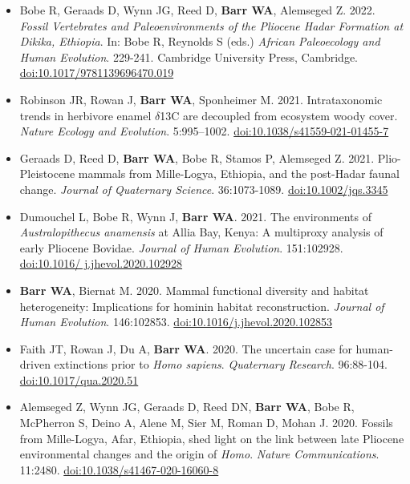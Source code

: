 \documentclass{article}
\begin{document}
\begin{itemize}
\item [] Bobe R, Geraads D, Wynn JG, Reed D, {\bfseries Barr WA}, Alemseged Z. 2022. \emph{Fossil Vertebrates and Paleoenvironments of the Pliocene Hadar Formation at Dikika, Ethiopia}. In: Bobe R, Reynolds S (eds.) \emph{African Paleoecology and Human Evolution}. 229-241. Cambridge University Press, Cambridge. \href{https://doi.org/10.1017/9781139696470.019}{doi:10.1017/9781139696470.019}

\item[] Robinson JR, Rowan J,  {\bfseries Barr WA}, Sponheimer M. 2021. Intrataxonomic trends in herbivore enamel $\delta$13C are decoupled from ecosystem woody cover.  \emph{Nature Ecology and Evolution}. 5:995–1002. \href{https://dx.doi.org/10.1038/s41559-021-01455-7}{doi:10.1038/s41559-021-01455-7}

\item[] Geraads D, Reed D, {\bfseries Barr WA}, Bobe R, Stamos P, Alemseged Z. 2021. Plio-Pleistocene mammals from Mille-Logya, Ethiopia, and the post-Hadar faunal change. \emph{Journal of Quaternary Science}. 36:1073-1089. \href{https://doi.org/10.1002/jqs.3345}{doi:10.1002/jqs.3345}

\item[] Dumouchel L, Bobe R, Wynn J, {\bfseries Barr WA}. 2021. The environments of \emph{Australopithecus anamensis} at Allia Bay, Kenya: A multiproxy analysis of early Pliocene Bovidae. \emph{Journal of Human Evolution}. 151:102928. \href{https://doi.org/10.1016/j.jhevol.2020.102928}{doi:10.1016/ j.jhevol.2020.102928}


\item[] {\bfseries Barr WA}, Biernat M. 2020. Mammal functional diversity and habitat heterogeneity: Implications for hominin habitat reconstruction. \emph{Journal of Human Evolution}. 146:102853. \href{https://dx.doi.org/10.1016/j.jhevol.2020.102853}{doi:10.1016/j.jhevol.2020.102853}

\item[] Faith JT, Rowan J, Du A, {\bfseries Barr WA}. 2020. The uncertain case for human-driven extinctions prior to \emph{Homo sapiens}. \emph{Quaternary Research}. 96:88-104. \href{https://dx.doi.org/10.1017/qua.2020.51}{doi:10.1017/qua.2020.51}

\item[] Alemseged Z, Wynn JG, Geraads D, Reed DN, {\bfseries Barr WA}, Bobe R, McPherron S, Deino A, Alene M, Sier M, Roman D,  Mohan J. 2020. Fossils from Mille-Logya, Afar, Ethiopia, shed light on the link between late Pliocene environmental changes and the origin of \emph{Homo}. \emph{Nature Communications}. 11:2480. \href{https://doi.org/10.1038/s41467-020-16060-8 }{doi:10.1038/s41467-020-16060-8}


\end{itemize}
\end{document}
